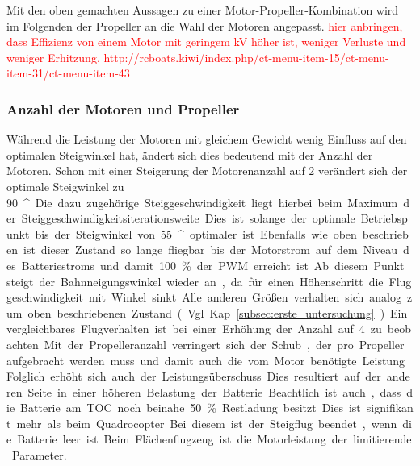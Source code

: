 Mit den oben gemachten Aussagen zu einer Motor-Propeller-Kombination wird im Folgenden der Propeller an die Wahl der Motoren angepasst.
\textcolor{red}{hier anbringen, dass Effizienz von einem Motor mit geringem kV höher ist, weniger Verluste und weniger Erhitzung, 
http://rcboats.kiwi/index.php/ct-menu-item-15/ct-menu-item-31/ct-menu-item-43}


\subsubsection{Anzahl der Motoren und Propeller}
Während die Leistung der Motoren mit gleichem Gewicht wenig Einfluss auf den optimalen Steigwinkel hat, ändert sich dies bedeutend mit der Anzahl der Motoren. Schon mit einer Steigerung der Motorenanzahl auf 2 verändert sich der optimale Steigwinkel zu \SI{90}{^\circ}. Die dazu zugehörige Steiggeschwindigkeit liegt hierbei beim Maximum der Steiggeschwindigkeitsiterationsweite. Dies ist solange der optimale Betriebspunkt bis der Steigwinkel von \SI{55}{^\circ} optimaler ist.
Ebenfalls wie oben beschrieben ist dieser Zustand so lange fliegbar bis der Motorstrom auf dem Niveau des Batteriestroms und damit \SI{100}{\%} der PWM erreicht ist. Ab diesem Punkt steigt der Bahnneigungswinkel wieder an, da für einen Höhenschritt die Fluggeschwindigkeit mit Winkel sinkt. Alle anderen Größen verhalten sich analog zum oben beschriebenen Zustand (Vgl. Kap. \ref{subsec:erste_untersuchung}). Ein vergleichbares Flugverhalten ist bei einer Erhöhung der Anzahl auf 4 zu beobachten.
Mit der Propelleranzahl verringert sich der Schub, der pro Propeller aufgebracht werden muss und damit auch die vom Motor benötigte Leistung. Folglich erhöht sich auch der Leistungsüberschuss. Dies resultiert auf der anderen Seite in einer höheren Belastung der Batterie. Beachtlich ist auch, dass die Batterie am TOC noch beinahe \SI{50}{\%} Restladung besitzt. Dies ist signifikant mehr als beim Quadrocopter. Bei diesem ist der Steigflug beendet, wenn die Batterie leer ist. Beim Flächenflugzeug ist die Motorleistung der limitierende Parameter.

